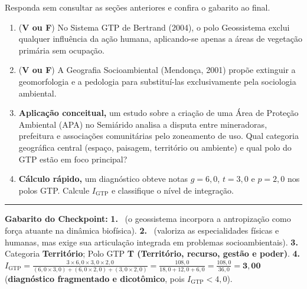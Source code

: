 \begin{boxTeste}
Responda sem consultar as seções anteriores e confira o gabarito ao final.
\begin{enumerate}[leftmargin=1.6em, itemsep=3pt]
  \item (\textbf{V ou F}) No Sistema GTP de Bertrand (2004), o polo Geossistema exclui qualquer influência da ação humana, aplicando-se apenas a áreas de vegetação primária sem ocupação.
  \item (\textbf{V ou F}) A Geografia Socioambiental (Mendonça, 2001) propõe extinguir a geomorfologia e a pedologia para substituí-las exclusivamente pela sociologia ambiental.
  \item \textbf{Aplicação conceitual,} um estudo sobre a criação de uma Área de Proteção Ambiental (APA) no Semiárido analisa a disputa entre mineradoras, prefeitura e associações comunitárias pelo zoneamento de uso. Qual categoria geográfica central (espaço, paisagem, território ou ambiente) e qual polo do GTP estão em foco principal?
  \item \textbf{Cálculo rápido,} um diagnóstico obteve notas $g = 6{,}0$, $t = 3{,}0$ e $p = 2{,}0$ nos polos GTP. Calcule $I_{\text{GTP}}$ e classifique o nível de integração.
\end{enumerate}
\vspace{3pt}
\hrule
\vspace{4pt}
{\footnotesize\textbf{Gabarito do Checkpoint:}
\textbf{1.} \F\ (o geossistema incorpora a antropização como força atuante na dinâmica biofísica). \quad
\textbf{2.} \F\ (valoriza as especialidades físicas e humanas, mas exige sua articulação integrada em problemas socioambientais). \quad
\textbf{3.} Categoria \textbf{Território}; Polo GTP \textbf{T (Território, recurso, gestão e poder)}. \quad
\textbf{4.} $I_{\text{GTP}} = \frac{3 \times 6{,}0 \times 3{,}0 \times 2{,}0}{(6{,}0\times 3{,}0)+(6{,}0\times 2{,}0)+(3{,}0\times 2{,}0)} = \frac{108{,}0}{18{,}0 + 12{,}0 + 6{,}0} = \frac{108{,}0}{36{,}0} = \mathbf{3{,}00}$ (\textbf{diagnóstico fragmentado e dicotômico}, pois $I_{\text{GTP}} < 4{,}0$).}
\end{boxTeste}
